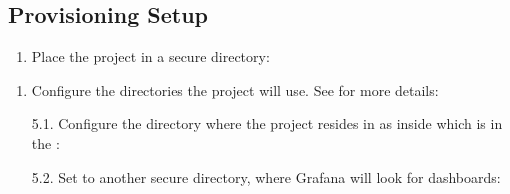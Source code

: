 \documentclass[letterpaper,10pt,english]{sphinxmanual}
\begin{document}
\subsection{Provisioning Setup}
\label{\detokenize{readme:provisioning-setup}}\begin{enumerate}
\def\theenumi{\arabic{enumi}}
\def\labelenumi{\theenumi .}
\makeatletter\def\p@enumii{\p@enumi \theenumi .}\makeatother
\setcounter{enumi}{3}
\item {} 
Place the project in a secure directory:

\begin{sphinxVerbatim}[commandchars=\\\{\}]
  
\end{sphinxVerbatim}

\end{enumerate}
\begin{enumerate}
\def\theenumi{\arabic{enumi}}
\def\labelenumi{\theenumi .}
\makeatletter\def\p@enumii{\p@enumi \theenumi .}\makeatother
\setcounter{enumi}{4}
\item {} 
{\hyperref[\detokenize{readme:r4}]{}} Configure the directories the project will use. See
{\hyperref[\detokenize{readme:configuration}]{}} for more details:

\begin{sphinxVerbatim}[commandchars=\\\{\}]
 
\end{sphinxVerbatim}

5.1. Configure the directory where the project resides in as  inside  which is in the :

\begin{sphinxVerbatim}[commandchars=\\\{\}]
 
\end{sphinxVerbatim}

5.2. Set  to another secure directory, where Grafana will look for dashboards:

\begin{sphinxVerbatim}[commandchars=\\\{\}]
 
\end{sphinxVerbatim}

\end{enumerate}
\end{document}
